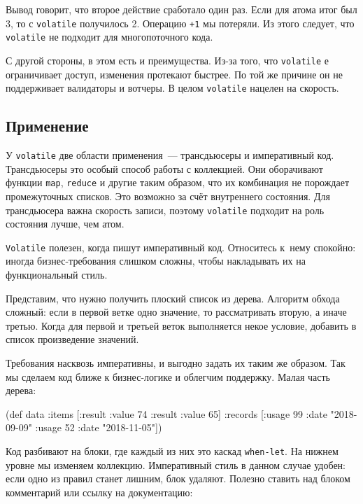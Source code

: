 Вывод говорит, что второе действие сработало один раз. Если для атома итог был
3, то с \verb|volatile| получилось 2. Операцию \verb|+1| мы потеряли. Из
этого следует, что \verb|volatile| не подходит для многопоточного кода.

С другой стороны, в этом есть и преимущества. Из-за того, что \verb|volatile|
е ограничивает доступ, изменения протекают быстрее. По той же причине он не
поддерживает валидаторы и вотчеры. В целом \verb|volatile| нацелен на
скорость.

\subsection{Применение}


У \verb|volatile| две области применения~--- трансдьюсеры и императивный
код. Трансдьюсеры это особый способ работы с коллекцией. Они оборачивают функции
\verb|map|, \verb|reduce| и другие таким образом, что их комбинация не
порождает промежуточных списков. Это возможно за счёт внутреннего состояния. Для
трансдьюсера важна скорость записи, поэтому \verb|volatile| подходит на роль
состояния лучше, чем атом.

\verb|Volatile| полезен, когда пишут императивный код. Относитесь к~нему
спокойно: иногда бизнес-требования слишком сложны, чтобы накладывать их на
функциональный стиль.

Представим, что нужно получить плоский список из дерева. Алгоритм обхода
сложный: если в первой ветке одно значение, то рассматривать вторую, а иначе
третью. Когда для первой и третьей веток выполняется некое условие, добавить в
список произведение значений.


Требования насквозь императивны, и выгодно задать их таким же образом. Так мы
сделаем код ближе к бизнес-логике и облегчим поддержку. Малая часть дерева:

\begin{english}
  \begin{clojure}
(def data
  {:items [{:result {:value 74}}
           {:result {:value 65}}]
   :records [{:usage 99 :date "2018-09-09"}
             {:usage 52 :date "2018-11-05"}]})
  \end{clojure}
\end{english}

Код разбивают на блоки, где каждый из них это каскад \verb|when-let|. На
нижнем уровне мы изменяем коллекцию. Императивный стиль в данном случае удобен:
если одно из правил станет лишним, блок удаляют. Полезно ставить над блоком
комментарий или ссылку на документацию:

